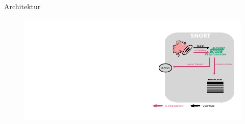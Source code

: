 \begin{frame}{Architektur}
    \begin{figure}
    	\centering
    	\includegraphics[width=\textwidth]{./images/arch/5.pdf}
    \end{figure}
\end{frame}
